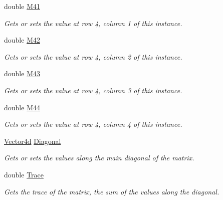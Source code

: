 \begin{DoxyCompactItemize}
double \hyperlink{struct_open_t_k_1_1_matrix4d_a076f90400e36e9744303b0517bf06f0e}{M41}
\begin{DoxyCompactList}\small\item\em Gets or sets the value at row 4, column 1 of this instance. \end{DoxyCompactList}\item 
double \hyperlink{struct_open_t_k_1_1_matrix4d_a701e2b458bdd86326fd6fd296ac591fc}{M42}
\begin{DoxyCompactList}\small\item\em Gets or sets the value at row 4, column 2 of this instance. \end{DoxyCompactList}\item 
double \hyperlink{struct_open_t_k_1_1_matrix4d_a5e32eefc79589f2f30b440967dceda54}{M43}
\begin{DoxyCompactList}\small\item\em Gets or sets the value at row 4, column 3 of this instance. \end{DoxyCompactList}\item 
double \hyperlink{struct_open_t_k_1_1_matrix4d_a3a3a0502b585d932040fc01f0e4b6659}{M44}
\begin{DoxyCompactList}\small\item\em Gets or sets the value at row 4, column 4 of this instance. \end{DoxyCompactList}\item 
\hyperlink{struct_open_t_k_1_1_vector4d}{Vector4d} \hyperlink{struct_open_t_k_1_1_matrix4d_a33e902458ac1b21fb62aac961b335999}{Diagonal}
\begin{DoxyCompactList}\small\item\em Gets or sets the values along the main diagonal of the matrix. \end{DoxyCompactList}\item 
double \hyperlink{struct_open_t_k_1_1_matrix4d_ac5f5931567c5c29743f09e55d77f32ba}{Trace}
\begin{DoxyCompactList}\small\item\em Gets the trace of the matrix, the sum of the values along the diagonal. \end{DoxyCompactList}\item 

\end{DoxyCompactItemize}
